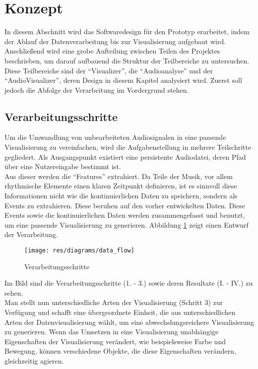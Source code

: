 \documentclass[11pt,a4paper]{article}
\begin{document}
\newpage
\section{Konzept}
In diesem Abschnitt wird das Softwaredesign für den Prototyp erarbeitet, indem der Ablauf der Datenverarbeitung bis zur Visualisierung aufgebaut wird. Anschließend wird eine grobe Aufteilung zwischen Teilen des Projektes beschrieben, um darauf aufbauend die Struktur der Teilbereiche zu untersuchen. Diese Teilbereiche sind der ``Visualizer'', die ``Audioanalyse'' und der ``AudioVisualizer'', deren Design in diesem Kapitel analysiert wird. Zuerst soll jedoch die Abfolge der Verarbeitung im Vordergrund stehen.

\subsection{Verarbeitungsschritte}
Um die Umwandlung von unbearbeiteten Audiosignalen in eine passende Visualisierung zu vereinfachen, wird die Aufgabenstellung in mehrere Teilschritte gegliedert. Als Ausgangspunkt existiert eine persistente Audiodatei, deren Pfad über eine Nutzereingabe bestimmt ist.\\
Aus dieser werden die ``Features'' extrahiert. Da Teile der Musik, vor allem rhythmische Elemente einen klaren Zeitpunkt definieren, ist es sinnvoll diese Informationen nicht wie die kontinuierlichen Daten zu speichern, sondern als Events zu extrahieren. Diese beruhen auf den vorher entwickelten Daten. Diese Events sowie die kontinuierlichen Daten werden zusammengefasst und benutzt, um eine passende Visualisierung zu generieren. Abbildung \ref{fig:Verarbeitungsschritte} zeigt einen Entwurf der Verarbeitung.
\begin{figure}[ht!]
\texttt{[image: res/diagrams/data\_flow]}
\caption[Verarbeitungsschritte]{Verarbeitungsschritte}
\label{fig:Verarbeitungsschritte}
\end{figure}

\noindent
Im Bild sind die Verarbeitungsschritte (1. - 3.) sowie deren Resultate (I. - IV.) zu sehen.\\
Man stellt nun unterschiedliche Arten der Visualisierung (Schritt 3) zur Verfügung und schafft eine übergeordnete Einheit, die aus unterschiedlichen Arten der Datenvisualisierung wählt, um eine abwechslungsreichere Visualisierung zu generieren. Wenn das Umsetzen in eine Visualisierung unabhängige Eigenschaften der Visualisierung verändert, wie beispielsweise Farbe und Bewegung, können verschiedene Objekte, die diese Eigenschaften verändern, gleichzeitig agieren.
\end{document}
